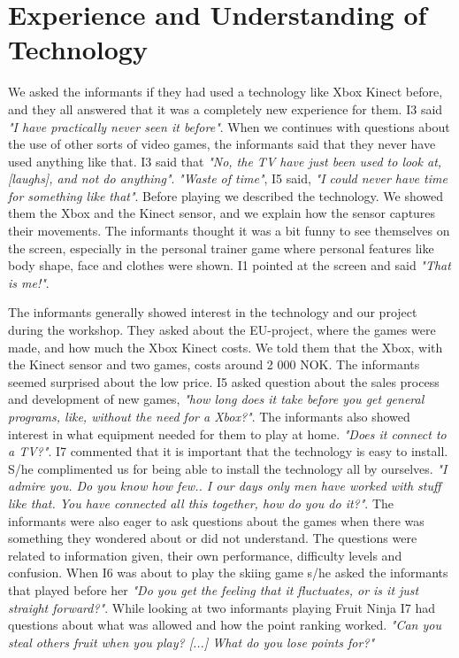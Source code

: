\section{Experience and Understanding of Technology}
We asked the informants if they had used a technology like Xbox Kinect before, and they all answered that it was a completely new experience for them. I3 said \emph{"I have practically never seen it before"}. When we continues with questions about the use of other sorts of video games, the informants said that they never have used anything like that. I3 said that \emph{"No, the TV have just been used to look at, [laughs], and not do anything"}. \emph{"Waste of time"}, I5 said, \emph{"I could never have time for something like that"}.  Before playing we described the technology. We showed them the Xbox and the Kinect sensor, and we explain how the sensor captures their movements. The informants thought it was a bit funny to see themselves on the screen, especially in the personal trainer game where personal features like body shape, face and clothes were shown. I1 pointed at the screen and said \emph{"That is me!"}. 

The informants generally showed interest in the technology and our project during the workshop. They asked about the EU-project, where the games were made, and how much the Xbox Kinect costs. We told them that the Xbox, with the Kinect sensor and two games, costs around 2 000 NOK. The informants seemed surprised about the low price. I5 asked question about the sales process and development of new games, \emph{"how long does it take before you get general programs, like, without the need for a Xbox?"}. The informants also showed interest in what equipment needed for them to play at home. \emph{"Does it connect to a TV?"}. I7 commented that it is important that the technology is easy to install. S/he complimented us for being able to install the technology all by ourselves. \emph{"I admire you. Do you know how few.. I our days only men have worked with stuff like that. You have connected all this together, how do you do it?"}.  The informants were also eager to ask questions about the games when there was something they wondered about or did not understand. The questions were related to information given, their own performance, difficulty levels and confusion. When I6 was about to play the skiing game s/he asked the informants that played before her \emph{"Do you get the feeling that it fluctuates, or is it just straight forward?"}. While looking at two informants playing Fruit Ninja I7 had questions about what was allowed and how the point ranking worked. \emph{"Can you steal others fruit when you play? [...] What do you lose points for?"} 

